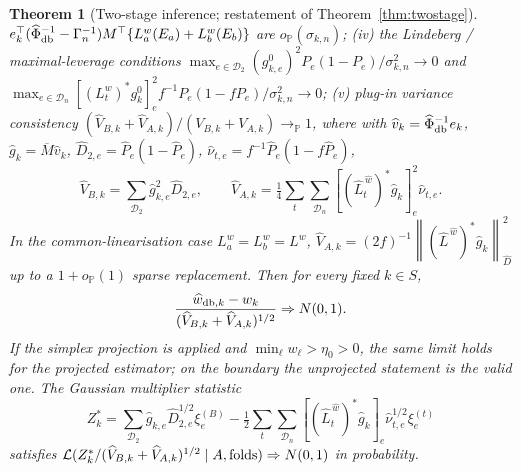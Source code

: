 \documentclass[12pt]{article}
\newtheorem{theorem}{Theorem}
\newcommand{\1}{\mathbf{1}}
\newcommand{\norm}[1]{\left\lVert#1\right\rVert}
\begin{document}
\begin{theorem}[Two-stage inference; restatement of Theorem~\ref{thm:twostage}]
$e_k^\top(\widehat\Phi_{\rm db}^{-1}-\Gamma_n^{-1})M^\top\{L_a^w(E_a)+L_b^w(E_b)\}$ are
$o_{\mathbb P}(\sigma_{k,n})$; \textup{(iv)} the Lindeberg / maximal-leverage conditions
$\max_{e\in\mathcal D_2}(g_{k,e}^0)^2P_e(1-P_e)/\sigma_{k,n}^2\to0$ and $\max_{e\in\mathcal
D_n}[(L_t^w)^*g_k^0]_e^2f^{-1}P_e(1-fP_e)/\sigma_{k,n}^2\to0$; \textup{(v)} plug-in variance
consistency $(\widehat V_{B,k}+\widehat V_{A,k})/(V_{B,k}+V_{A,k})\to_{\mathbb P}1$, where with
$\widehat v_k=\widehat\Phi_{\rm db}^{-1}e_k$, $\widehat g_k=\overline M\widehat v_k$, $\widehat
D_{2,e}=\widehat P_e(1-\widehat P_e)$, $\widehat\nu_{t,e}=f^{-1}\widehat P_e(1-f\widehat P_e)$,
\[
        \widehat V_{B,k}=\sum_{\mathcal D_2}\widehat g_{k,e}^2\widehat D_{2,e},\qquad
        \widehat V_{A,k}=\tfrac14\sum_{t}\sum_{\mathcal D_n}[(\widehat L_t^{\,\widehat
        w})^*\widehat g_k]_e^2\widehat\nu_{t,e}.
\]
In the common-linearisation case $L_a^w=L_b^w=L^w$, $\widehat V_{A,k}=(2f)^{-1}\norm{(\widehat
L^{\,\widehat w})^*\widehat g_k}_{\widehat D}^2$ up to a $1+o_{\mathbb P}(1)$ sparse replacement.
Then for every fixed $k\in S$,
\[
        \frac{\widehat w_{{\rm db},k}-w_k}{(\widehat V_{B,k}+\widehat V_{A,k})^{1/2}}\Rightarrow N(0,1).
\]
If the simplex projection is applied and $\min_\ell w_\ell>\eta_0>0$, the same limit holds for the
projected estimator; on the boundary the unprojected statement is the valid one. The Gaussian
multiplier statistic
\[
        Z_k^*=\sum_{\mathcal D_2}\widehat g_{k,e}\widehat D_{2,e}^{1/2}\xi^{(B)}_e-\tfrac12\sum_t\sum_{\mathcal
        D_n}[(\widehat L_t^{\,\widehat w})^*\widehat g_k]_e\widehat\nu_{t,e}^{1/2}\xi^{(t)}_e
\]
satisfies $\mathcal L(Z_k^*/(\widehat V_{B,k}+\widehat V_{A,k})^{1/2}\mid A,{\rm folds})\Rightarrow
N(0,1)$ in probability.
\end{theorem}
\end{document}
